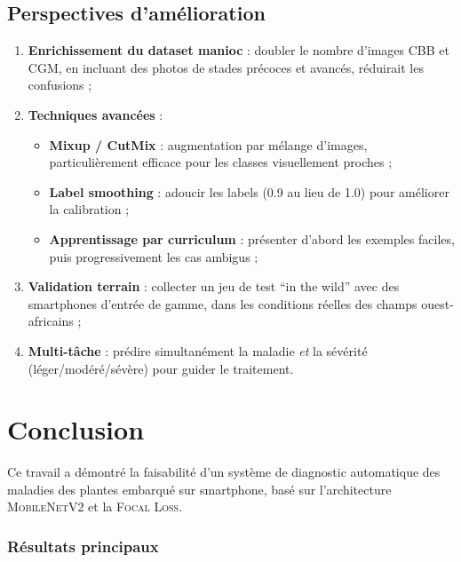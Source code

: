 \documentclass[12pt, a4paper, twoside]{report}
\newcommand{\focal}{\textsc{Focal Loss}}
\newcommand{\mobilenet}{\textsc{MobileNetV2}}
\begin{document}
\section{Perspectives d'amélioration}

\begin{enumerate}
    \item \textbf{Enrichissement du dataset manioc} : doubler le nombre d'images CBB et CGM, en incluant des photos de stades précoces et avancés, réduirait les confusions ;

    \item \textbf{Techniques avancées} :
    \begin{itemize}
        \item \textbf{Mixup / CutMix} : augmentation par mélange d'images, particulièrement efficace pour les classes visuellement proches ;
        \item \textbf{Label smoothing} : adoucir les labels (0.9 au lieu de 1.0) pour améliorer la calibration ;
        \item \textbf{Apprentissage par curriculum} : présenter d'abord les exemples faciles, puis progressivement les cas ambigus ;
    \end{itemize}

    \item \textbf{Validation terrain} : collecter un jeu de test ``in the wild'' avec des smartphones d'entrée de gamme, dans les conditions réelles des champs ouest-africains ;

    \item \textbf{Multi-tâche} : prédire simultanément la maladie \textit{et} la sévérité (léger/modéré/sévère) pour guider le traitement.
\end{enumerate}


\chapter{Conclusion}
\label{chap:conclusion}

Ce travail a démontré la faisabilité d'un système de diagnostic automatique des maladies des plantes embarqué sur smartphone, basé sur l'architecture \mobilenet{} et la \focal{}.

\subsection*{Résultats principaux}
\end{document}
